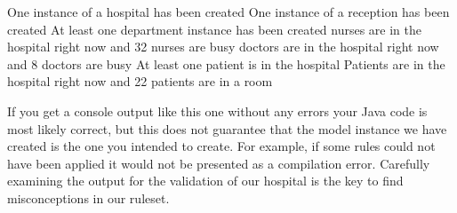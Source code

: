 {{\textsf{One instance of a hospital has been created\newline
One instance of a reception has been created\newline
At least one department instance has been created nurses are in the hospital right now and 32 nurses are busy doctors are in the hospital right now and 8 doctors are busy\newline
At least one patient is in the hospital Patients are in the hospital right now and 22 patients are in a room}\newline

}

If you get a console output like this one without any errors your Java code is most likely correct, but this does not guarantee that the model instance we have created is the one you intended to create.\newline
For example, if some rules could not have been applied it would not be presented as a compilation error. Carefully examining the output for the validation of our hospital is the key to find misconceptions in our ruleset.

\clearpage






}

